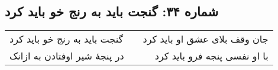 \begin{center}
\section*{شماره ۳۴: گنجت باید به رنج خو باید کرد}
\label{sec:034}
\begin{longtable}{l p{0.5cm} r}
گنجت باید به رنج خو باید کرد
&&
جان وقف بلای عشق او باید کرد
\\
در پنجهٔ شیر اوفتادن به ازانک
&&
با او نفسی پنجه فرو باید کرد
\\
\end{longtable}
\end{center}
